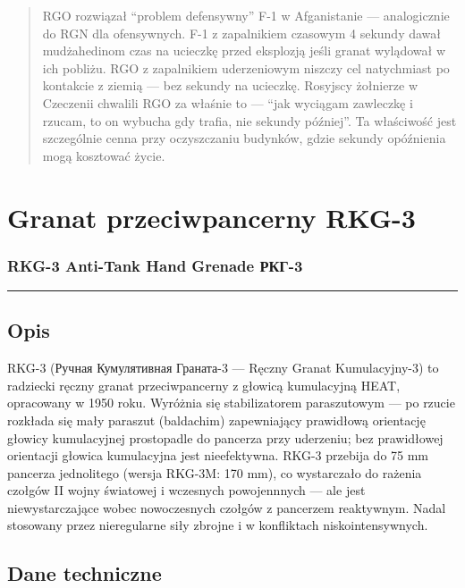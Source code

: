 \documentclass[12pt,openany,oneside]{book}
\begin{document}
\begin{quote}
RGO rozwiązał ``problem defensywny'' F-1 w Afganistanie --- analogicznie
do RGN dla ofensywnych. F-1 z zapalnikiem czasowym 4 sekundy dawał
mudżahedinom czas na ucieczkę przed eksplozją jeśli granat wylądował w
ich pobliżu. RGO z zapalnikiem uderzeniowym niszczy cel natychmiast po
kontakcie z ziemią --- bez sekundy na ucieczkę. Rosyjscy żołnierze w
Czeczenii chwalili RGO za właśnie to --- ``jak wyciągam zawleczkę i
rzucam, to on wybucha gdy trafia, nie sekundy później''. Ta właściwość
jest szczególnie cenna przy oczyszczaniu budynków, gdzie sekundy
opóźnienia mogą kosztować życie.
\end{quote}

\chapter{Granat przeciwpancerny
RKG-3}\label{granat-przeciwpancerny-rkg-3}

\subsection{RKG-3 Anti-Tank Hand Grenade \textbar{}
РКГ-3}\label{rkg-3-anti-tank-hand-grenade-ux440ux43aux433-3}

\begin{center}\rule{0.5\linewidth}{0.5pt}\end{center}

\section{Opis}\label{opis-105}

RKG-3 (Ручная Кумулятивная Граната-3 --- Ręczny Granat Kumulacyjny-3) to
radziecki ręczny granat przeciwpancerny z głowicą kumulacyjną HEAT,
opracowany w 1950 roku. Wyróżnia się stabilizatorem paraszutowym --- po
rzucie rozkłada się mały paraszut (baldachim) zapewniający prawidłową
orientację głowicy kumulacyjnej prostopadle do pancerza przy uderzeniu;
bez prawidłowej orientacji głowica kumulacyjna jest nieefektywna. RKG-3
przebija do 75 mm pancerza jednolitego (wersja RKG-3M: 170 mm), co
wystarczało do rażenia czołgów II wojny światowej i wczesnych
powojennnych --- ale jest niewystarczające wobec nowoczesnych czołgów z
pancerzem reaktywnym. Nadal stosowany przez nieregularne siły zbrojne i
w konfliktach niskointensywnych.

\section{Dane techniczne}\label{dane-techniczne-105}
\end{document}
